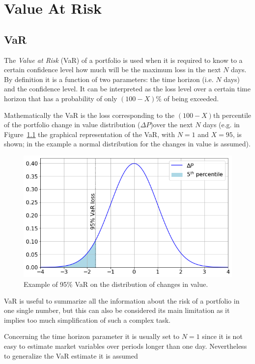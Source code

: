 \chapter{Value At Risk}
\label{var-and-credit-risk}

\section{VaR}
\label{value-at-risk}

The \emph{Value at Risk} (VaR) of a portfolio is used when it is required to know to a certain confidence level how much will be the maximum loss in the next $N$ days. By definition it is a function of two parameters: the time horizon (i.e. $N$ days) and the confidence level. 
It can be interpreted as the loss level over a certain time horizon that has a probability of only \((100 - X)\%\) of being exceeded. 

Mathematically the VaR is the loss corresponding to the \((100-X)\textrm{th}\) percentile of the portfolio change in value distribution ($\Delta P$)over the next $N$ days (e.g. in Figure~\ref{fig:var_loss} the graphical representation of the VaR, with $N=1$ and $X=95$, is shown; in the example a normal distribution for the changes in value is assumed).

\begin{figure}[htb]
\centering
\includegraphics[width=0.6\linewidth]{figures/95_var.png}
\caption{Example of 95\% VaR on the distribution of changes in value.}
\label{fig:var_loss}
\end{figure}
    
VaR is useful to summarize all the information about the risk of a portfolio in one single number, but this can also be considered its main limitation as it implies too much simplification of such a complex task.

Concerning the time horizon parameter it is usually set to $N=1$ since it is not easy to estimate market variables over periods longer than one day. Nevertheless to generalize the VaR estimate it is assumed

